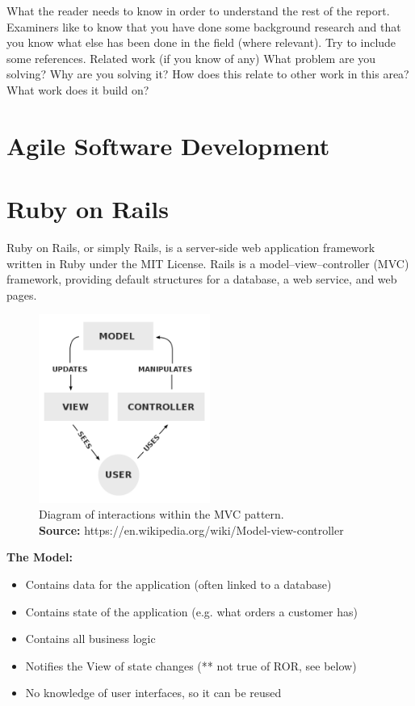 
What the reader needs to know in order to understand the rest of the report. Examiners like to know that you have done some background research and that you know what else has been done in the field (where relevant). Try to include some references.
    Related work (if you know of any)
    What problem are you solving?
    Why are you solving it?
    How does this relate to other work in this area?
    What work does it build on?
    
\section{Agile Software Development}

\newpage

\section{Ruby on Rails} 
Ruby on Rails, or simply Rails, is a server-side web application framework written in Ruby under the MIT License. Rails is a model–view–controller (MVC) framework, providing default structures for a database, a web service, and web pages. \cite{wiki:RoR}

\begin{figure}[H]
	\centering
    \includegraphics[trim={0 0 0 0},clip,width=0.5\textwidth]{Files/MVC.png}
    \caption{Diagram of interactions within the MVC pattern.\\ \textbf{Source:} https://en.wikipedia.org/wiki/Model-view-controller}
    \label{fig: MVC}
\end{figure}




\textbf{The Model:}
\vspace{-5mm}
\begin{itemize}
 \setlength{\itemsep}{-5pt}
\item Contains data for the application (often linked to a database)
\item Contains state of the application (e.g. what orders a customer has)
\item  Contains all business logic
\item Notifies the View of state changes (** not true of ROR, see below)
\item No knowledge of user interfaces, so it can be reused
\end{itemize}

